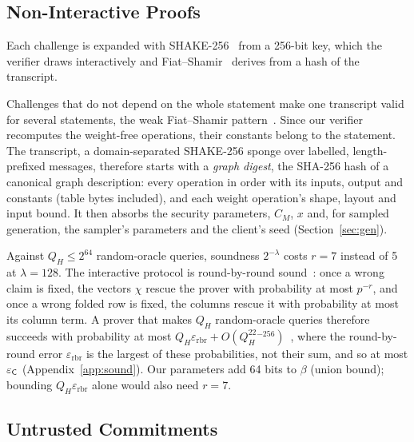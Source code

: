 \subsection{Non-Interactive Proofs}
\label{sec:fs}

Each challenge is expanded with SHAKE-256~\cite{fips202} from a 256-bit key, which the verifier
draws interactively and Fiat--Shamir~\cite{fiatshamir1986} derives from a hash of the transcript.

 Challenges that do not depend on the whole statement
make one transcript valid for several statements, the weak Fiat--Shamir
pattern~\cite{bernhard2012pitfalls,dao2023weakfs}. Since our verifier recomputes the weight-free
operations, their constants belong to the statement. The transcript, a domain-separated
SHAKE-256 sponge over labelled, length-prefixed messages, therefore starts with a \emph{graph
digest}, the SHA-256 hash of a canonical graph description: every operation in order with its
inputs, output and constants (table bytes included), and each weight operation's shape, layout and
input bound. It then absorbs the security parameters, $C_M$, $x$ and, for sampled generation, the
sampler's parameters and the client's seed (Section~\ref{sec:gen}).

 Against $Q_H\le2^{64}$ random-oracle queries, soundness
$2^{-\lambda}$ costs $r=7$ instead of 5 at $\lambda=128$. The interactive protocol is
round-by-round sound~\cite{canetti2019fs}: once a
wrong claim is fixed, the vectors $\chi$ rescue the prover with probability at most $p^{-r}$, and
once a wrong folded row is fixed, the columns rescue it with probability at most its column term. A
prover that makes $Q_H$ random-oracle queries therefore succeeds with probability at most
$Q_H\varepsilon_{\mathrm{rbr}}+O(Q_H^22^{-256})$~\cite{canetti2019fs,holmgren2019rbr,bcs16}, where the
round-by-round error $\varepsilon_{\mathrm{rbr}}$ is the largest of these probabilities, not their
sum, and so at most $\varepsilon_{\mathsf{C}}$ (Appendix~\ref{app:sound}). Our parameters add 64
bits to $\beta$ (union bound); bounding
$Q_H\varepsilon_{\mathrm{rbr}}$ alone would also need $r=7$.

\subsection{Untrusted Commitments}
\label{sec:setup-proof}


